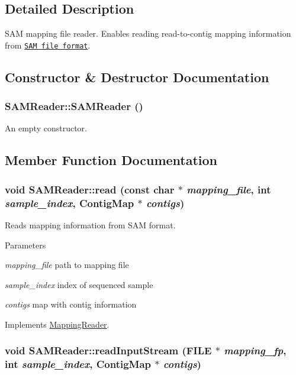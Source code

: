\subsection{Detailed Description}
SAM mapping file reader. Enables reading read-\/to-\/contig mapping information from \href{http://samtools.github.io/}{\tt SAM file format}. 

\subsection{Constructor \& Destructor Documentation}
\hypertarget{classSAMReader_a02e0ad94153bdfb9beb2dc809b4a6741}{
\subsubsection[{SAMReader}]{\setlength{\rightskip}{0pt plus 5cm}SAMReader::SAMReader ()}}
\label{classSAMReader_a02e0ad94153bdfb9beb2dc809b4a6741}
An empty constructor. 

\subsection{Member Function Documentation}
\hypertarget{classSAMReader_a6c11ffaf56aa72aae2d5999cbd21de6f}{
\subsubsection[{read}]{\setlength{\rightskip}{0pt plus 5cm}void SAMReader::read (const char $\ast$ {\em mapping\_\-file}, \/  int {\em sample\_\-index}, \/  {\bf ContigMap} $\ast$ {\em contigs})}}
\label{classSAMReader_a6c11ffaf56aa72aae2d5999cbd21de6f}


Reads mapping information from SAM format. 
\begin{DoxyParams}{Parameters}
\item[{\em mapping\_\-file}]path to mapping file \item[{\em sample\_\-index}]index of sequenced sample \item[{\em contigs}]map with contig information \end{DoxyParams}
 

Implements \hyperlink{classMappingReader_ab661f4713f0f686f5476aa796d0d7585}{MappingReader}.\hypertarget{classSAMReader_a5871df65884559cc9add85881617e9c3}{
\subsubsection[{readInputStream}]{\setlength{\rightskip}{0pt plus 5cm}void SAMReader::readInputStream (FILE $\ast$ {\em mapping\_\-fp}, \/  int {\em sample\_\-index}, \/  {\bf ContigMap} $\ast$ {\em contigs})}}
\label{classSAMReader_a5871df65884559cc9add85881617e9c3}


